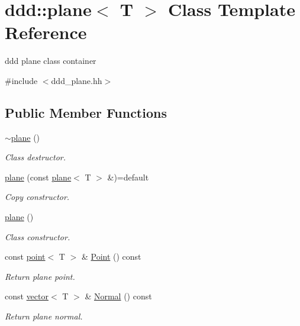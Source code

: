 \hypertarget{classddd_1_1plane}{}\section{ddd\+:\+:plane$<$ T $>$ Class Template Reference}
\label{classddd_1_1plane}


ddd plane class container  




{\ttfamily \#include $<$ddd\+\_\+plane.\+hh$>$}

\subsection*{Public Member Functions}
\begin{DoxyCompactItemize}
\item 
\mbox{\label{classddd_1_1plane_aeaeb43102be169cd96f64a36d594dc30}} 
\hyperlink{classddd_1_1plane_aeaeb43102be169cd96f64a36d594dc30}{$\sim$plane} ()
\begin{DoxyCompactList}\small\item\em Class destructor. \end{DoxyCompactList}\item 
\mbox{\label{classddd_1_1plane_a52ed398bc1781834fde8b17ae329aefc}} 
\hyperlink{classddd_1_1plane_a52ed398bc1781834fde8b17ae329aefc}{plane} (const \hyperlink{classddd_1_1plane}{plane}$<$ T $>$ \&)=default
\begin{DoxyCompactList}\small\item\em Copy constructor. \end{DoxyCompactList}\item 
\mbox{\label{classddd_1_1plane_a4c3295ab6713fdcd2af22ca1d1072b36}} 
\hyperlink{classddd_1_1plane_a4c3295ab6713fdcd2af22ca1d1072b36}{plane} ()
\begin{DoxyCompactList}\small\item\em Class constructor. \end{DoxyCompactList}\item 
\mbox{\label{classddd_1_1plane_a17e86e433119b18b610f46b7035b328e}} 
const \hyperlink{classddd_1_1point}{point}$<$ T $>$ \& \hyperlink{classddd_1_1plane_a17e86e433119b18b610f46b7035b328e}{Point} () const
\begin{DoxyCompactList}\small\item\em Return plane point. \end{DoxyCompactList}\item 
\mbox{\label{classddd_1_1plane_ad15272cb68d76c2702633de0e919db32}} 
const \hyperlink{classddd_1_1vector}{vector}$<$ T $>$ \& \hyperlink{classddd_1_1plane_ad15272cb68d76c2702633de0e919db32}{Normal} () const
\begin{DoxyCompactList}\small\item\em Return plane normal. \end{DoxyCompactList}\end{DoxyCompactItemize}


